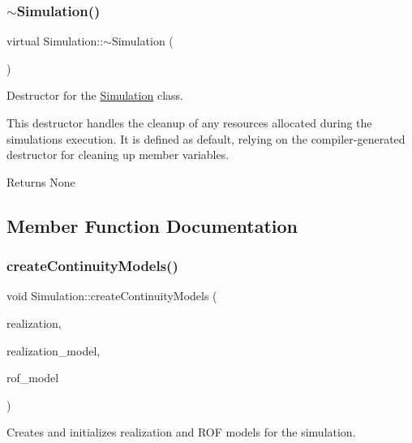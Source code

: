 \subsubsection{\texorpdfstring{$\sim$\+Simulation()}{~Simulation()}}
{\footnotesize\ttfamily virtual Simulation\+::$\sim$\+Simulation (\begin{DoxyParamCaption}{ }\end{DoxyParamCaption})\hspace{0.3cm}{\ttfamily [virtual]}}



Destructor for the \mbox{\hyperlink{classSimulation}{Simulation}} class. 

This destructor handles the cleanup of any resources allocated during the simulation\textquotesingle{}s execution. It is defined as default, relying on the compiler-\/generated destructor for cleaning up member variables.

\begin{DoxyReturn}{Returns}
None 
\end{DoxyReturn}


\subsection{Member Function Documentation}
\mbox{\label{classSimulation_aa2e2863a0038345c46dd827b97008347}} 
\subsubsection{\texorpdfstring{create\+Continuity\+Models()}{createContinuityModels()}}
{\footnotesize\ttfamily void Simulation\+::create\+Continuity\+Models (\begin{DoxyParamCaption}\item[{unsigned long}]{realization,  }\item[{\mbox{\hyperlink{classContinuityModelRealization}{Continuity\+Model\+Realization}} $\ast$\&}]{realization\+\_\+model,  }\item[{\mbox{\hyperlink{classContinuityModelROF}{Continuity\+Model\+R\+OF}} $\ast$\&}]{rof\+\_\+model }\end{DoxyParamCaption})}



Creates and initializes realization and R\+OF models for the simulation. 

